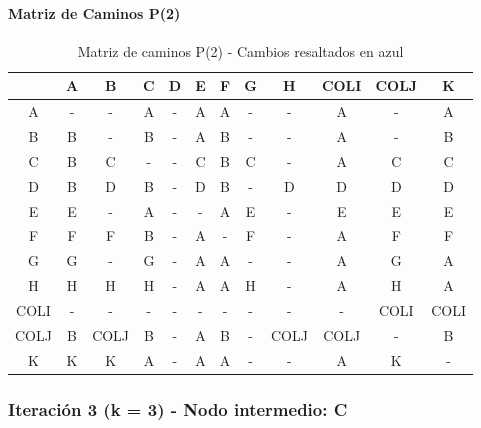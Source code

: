 \documentclass[12pt]{article}
\begin{document}
\paragraph{Matriz de Caminos P(2)}
\begin{table}[h!]
\centering
\begin{tabular}{|c|c|c|c|c|c|c|c|c|c|c|c|}
\hline
 & A & B & C & D & E & F & G & H & COLI & COLJ & K \\\hline
A & - & - & A & - & A & A & - & - & A & - & A \\\hline
B & B & - & B & - & A & B & - & - & A & - & B \\\hline
C & \cellcolor{lightblue} B & C & - & - & C & \cellcolor{lightblue} B & C & - & \cellcolor{lightblue} A & C & C \\\hline
D & \cellcolor{lightblue} B & D & \cellcolor{lightblue} B & - & D & \cellcolor{lightblue} B & - & D & D & D & D \\\hline
E & E & - & A & - & - & A & E & - & E & E & E \\\hline
F & F & F & \cellcolor{lightblue} B & - & A & - & F & - & A & F & F \\\hline
G & G & - & G & - & A & A & - & - & A & G & A \\\hline
H & H & H & H & - & A & A & H & - & A & H & A \\\hline
COLI & - & - & - & - & - & - & - & - & - & COLI & COLI \\\hline
COLJ & \cellcolor{lightblue} B & COLJ & \cellcolor{lightblue} B & - & A & \cellcolor{lightblue} B & - & COLJ & COLJ & - & \cellcolor{lightblue} B \\\hline
K & K & K & A & - & A & A & - & - & A & K & - \\\hline
\end{tabular}
\caption{Matriz de caminos P(2) - Cambios resaltados en azul}
\end{table}

\subsubsection{Iteración 3 (k = 3) - Nodo intermedio: C}
\end{document}
